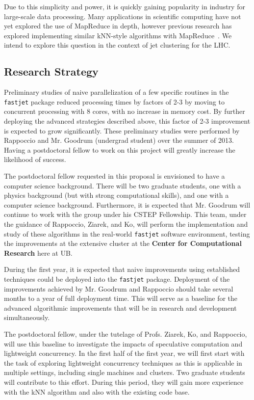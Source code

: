 \documentclass[times,11pt]{article}
\begin{document}
Due to this simplicity and power, it is quickly gaining popularity in industry
for large-scale data processing. Many applications in scientific computing have not
yet explored the use of MapReduce in depth, however
previous research has explored implementing similar kNN-style
algorithms with
MapReduce~\cite{knn-mapreduce-0, knn-mapreduce-1}. We intend to explore this
question in the context of jet clustering for the LHC.



\subsection{Research Strategy}

Preliminary studies of naive parallelization of a few specific
routines in the {\tt fastjet} package reduced processing times by
factors of 2-3 by moving to concurrent processing with 8 cores, with
no increase in memory cost. By further deploying the advanced
strategies described above, this factor of 2-3 improvement is expected
to grow significantly. 
These preliminary studies were performed by Rappoccio and Mr.
Goodrum (undergrad student) over the summer of 2013. Having a
postdoctoral fellow to work on this project will greatly increase the
likelihood of success. 

The postdoctoral fellow requested in this proposal is envisioned to
have a computer science background. There will be two graduate
students, one with a physics background (but with strong computational
skills), and one with a computer science background. Furthermore, it
is expected that Mr. Goodrum will continue to work with the group
under his CSTEP Fellowship. This team, under
the guidance of Rappoccio, Ziarek, and Ko, will perform the
implementation and study of these algorithms in the real-world 
{\tt fastjet} software environment, testing the improvements at the
extensive cluster at the {\bf Center for Computational Research} here
at UB. 

During the first year, it is expected that naive improvements using
established techniques could be deployed into the {\tt fastjet}
package. Deployment of the improvements achieved by Mr. Goodrum and
Rappoccio should take several months to a year of full deployment
time. This will serve as a baseline for the advanced algorithmic
improvements that will be in research and development simultaneously. 

The postdoctoral fellow, under the tutelage of Profs. Ziarek, Ko, and
Rappoccio, will use this baseline to investigate the impacts of speculative
computation and lightweight concurrency. In the first half of the first year,
we will first start with the task of exploring lightweight concurrency
techniques as this is applicable in multiple settings, including single machines
and clusters. Two graduate students will contribute to
this effort. During this period, they will gain more experience with the kNN
algorithm and also with the existing code base.
\end{document}

